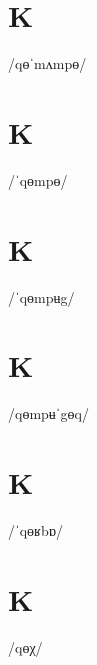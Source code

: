\documentclass[10pt,a4paper,twoside]{book}
\begin{document}
\section*{K}

\begin{multicols}{3}
 {/qɵˈmʌmpɵ/} {}
\end{multicols}

\section*{K}

\begin{multicols}{3}
 {/ˈqɵmpɵ/} {}
\end{multicols}

\section*{K}

\begin{multicols}{3}
 {/ˈqɵmpʉg/} {}
\end{multicols}

\section*{K}

\begin{multicols}{3}
 {/qɵmpʉˈgɵq/} {}
\end{multicols}

\section*{K}

\begin{multicols}{3}
 {/ˈqɵʁbɒ/} {}
\end{multicols}

\section*{K}

\begin{multicols}{3}
 {/qɵχ/} {}
\end{multicols}
\end{document}
